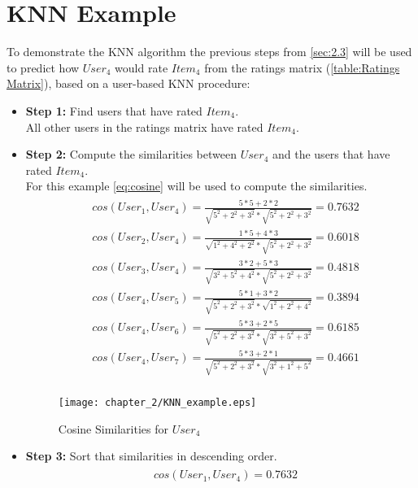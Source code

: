 \section{KNN Example}
To demonstrate the KNN algorithm the previous steps from \autoref{sec:2.3} will be used
to predict how $User_4$ would rate $Item_4$ from the ratings matrix
(\autoref{table:Ratings Matrix}), based on a user-based KNN procedure:
\begin{itemize}
	\item[] \textbf{Step 1:} Find users that have rated $Item_4$.\\
	All other users in the ratings matrix have rated $Item_4$.
	\item[] \textbf{Step 2:} Compute the similarities between $User_4$ and the users that have
	rated $Item_4$.\\
	For this example \autoref{eq:cosine} will be used to compute the similarities.\\
	\begin{align*}
		\begin{split}
			&cos(User_1, User_4) = \frac{5*5 + 2*2}{\sqrt{5^2 + 2^2 + 3^2}*\sqrt{5^2 + 2^2 + 3^2}} = 0.7632\\
			&cos(User_2, User_4) = \frac{1*5 + 4*3}{\sqrt{1^2 + 4^2 + 2^2}*\sqrt{5^2 + 2^2 + 3^2}} = 0.6018\\
			&cos(User_3, User_4) = \frac{3*2 + 5*3}{\sqrt{3^2 + 5^2 + 4^2}*\sqrt{5^2 + 2^2 + 3^2}} = 0.4818\\
			&cos(User_4, User_5) = \frac{5*1 + 3*2}{\sqrt{5^2 + 2^2 + 3^2}*\sqrt{1^2 + 2^2 + 4^2}} = 0.3894\\
			&cos(User_4, User_6) = \frac{5*3 + 2*5}{\sqrt{5^2 + 2^2 + 3^2}*\sqrt{3^2 + 5^2 + 3^2}} = 0.6185\\
			&cos(User_4, User_7) = \frac{5*3 + 2*1}{\sqrt{5^2 + 2^2 + 3^2}*\sqrt{3^2 + 1^2 + 5^2}} = 0.4661\\
		\end{split}
	\end{align*}
	\begin{figure}[H]
	\centering
	\texttt{[image: chapter\_2/KNN\_example.eps]}
	\caption{Cosine Similarities for $User_4$}
	\label{figure:KNN_example}
	\end{figure}
	\item[] \textbf{Step 3:}  Sort that similarities in descending order.
	\begin{align*}
		\begin{split}
			&cos(User_1, User_4) = 0.7632\\

\end{split}
\end{align*}
\end{itemize}
